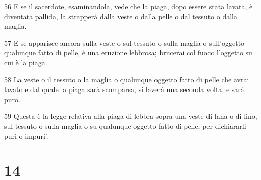 \par 56 E se il sacerdote, esaminandola, vede che la piaga, dopo essere stata lavata, è diventata pallida, la strapperà dalla veste o dalla pelle o dal tessuto o dalla maglia.
\par 57 E se apparisce ancora sulla veste o sul tessuto o sulla maglia o sull'oggetto qualunque fatto di pelle, è una eruzione lebbrosa; brucerai col fuoco l'oggetto su cui è la piaga.
\par 58 La veste o il tessuto o la maglia o qualunque oggetto fatto di pelle che avrai lavato e dal quale la piaga sarà scomparsa, si laverà una seconda volta, e sarà puro.
\par 59 Questa è la legge relativa alla piaga di lebbra sopra una veste di lana o di lino, sul tessuto o sulla maglia o su qualunque oggetto fatto di pelle, per dichiararli puri o impuri'.

\chapter{14}

